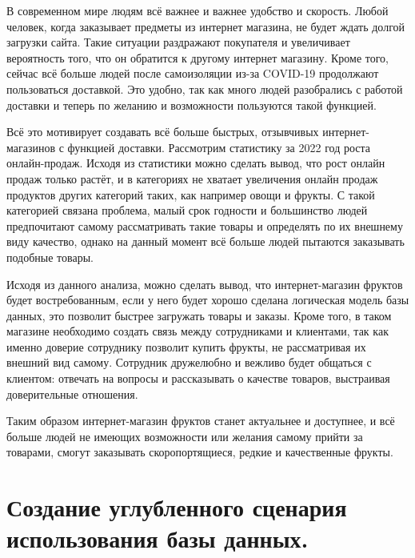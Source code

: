 \documentclass[14pt]{extreport}
\begin{document}
\pagestyle{empty} %


\setcounter{page}{1}
\tableofcontents

\intro
\pagestyle{plain} %
\setcounter{page}{1}
В современном мире людям всё важнее и важнее удобство и скорость. Любой человек, когда заказывает предметы из интернет магазина, не будет ждать долгой загрузки сайта. Такие ситуации раздражают покупателя и увеличивает вероятность того, что он обратится к другому интернет магазину.
Кроме того, сейчас всё больше людей после самоизоляции из-за COVID-19 продолжают пользоваться доставкой. Это удобно, так как много людей разобрались с работой доставки и теперь по желанию и возможности пользуются такой функцией. 

Всё это мотивирует создавать всё больше быстрых, отзывчивых интернет-магазинов с функцией доставки. Рассмотрим статистику за 2022 год роста онлайн-продаж. Исходя из статистики можно сделать вывод, что рост онлайн продаж только растёт, и в категориях не хватает увеличения онлайн продаж продуктов других категорий таких, как например овощи и фрукты. С такой категорией связана проблема, малый срок годности и большинство людей предпочитают самому рассматривать такие товары и определять по их внешнему виду качество, однако на данный момент всё больше людей пытаются заказывать подобные товары.

Исходя из данного анализа, можно сделать вывод, что интернет-магазин фруктов будет востребованным, если у него будет хорошо сделана логическая модель базы данных, это позволит быстрее загружать товары и заказы. Кроме того, в таком магазине необходимо создать связь между сотрудниками и клиентами, так как именно доверие сотруднику позволит купить фрукты, не рассматривая их внешний вид самому. Сотрудник дружелюбно и вежливо будет общаться с клиентом: отвечать на вопросы и рассказывать о качестве товаров, выстраивая доверительные отношения.

Таким образом интернет-магазин фруктов станет актуальнее и доступнее, и всё больше людей не имеющих возможности или желания самому прийти за товарами, смогут заказывать скоропортящиеся, редкие и качественные фрукты.




\chapter{Создание углубленного сценария использования базы данных.}
\end{document}
